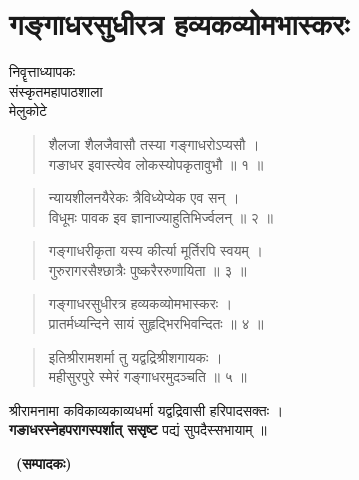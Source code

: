 \chapter{गङ्गाधरसुधीरत्र हव्यकव्योमभास्करः}

\begin{center}
\smallskip

निवॄत्ताध्यापकः\\
संस्कृतमहापाठशाला\\
मेलुकोटे
\end{center}

\begin{verse}
शैलजा शैलजैवासौ तस्या गङ्गाधरोऽप्यसौ ।\\
गङाधर इवास्त्येव लोकस्योपकृतावुभौ ॥ १ ॥
\end{verse}

\begin{verse}
न्यायशीलनयैरेकः त्रैविध्येप्येक एव सन् ।\\
विधूमः पावक इव ज्ञानाज्याहुतिभिर्ज्वलन् ॥ २ ॥
\end{verse}

\begin{verse}
गङ्गाधरीकृता यस्य कीर्त्या मूर्तिरपि स्वयम् ।\\
गुरुरागरसैश्छात्रैः पुष्करैररुणायिता ॥ ३ ॥
\end{verse}

\begin{verse}
गङ्गाधरसुधीरत्र हव्यकव्योमभास्करः ।\\
प्रातर्मध्यन्दिने सायं सुहृद्भिरभिवन्दितः ॥ ४ ॥
\end{verse}

\begin{verse} 
इतिश्रीरामशर्मा तु यद्वद्रिश्रीशगायकः ।\\
महीसुरपुरे स्मेरं गङ्गाधरमुदञ्चति ॥ ५ ॥
\end{verse}

\begin{center}
श्रीरामनामा कविकाव्यकाव्यधर्मा यद्वद्रिवासी हरिपादसक्तः ।\\
\textbf{गङाधरस्नेहपरागस्पर्शात् ससृष्ट} पद्यं सुपदैस्सभायाम् ॥ 
\end{center}

~\hfill\textbf{(सम्पादकः)}
